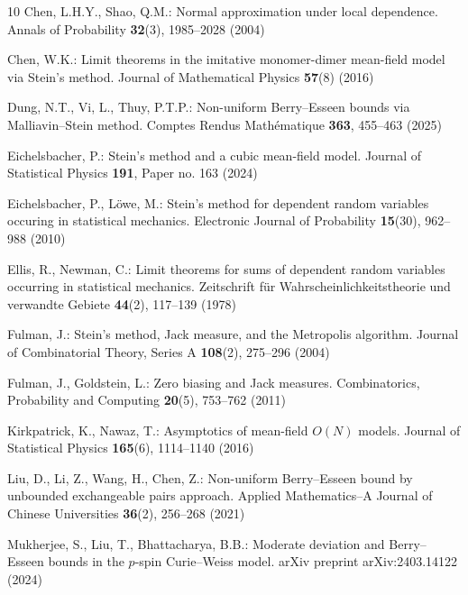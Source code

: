 \begin{thebibliography}{10}
	Chen, L.H.Y., Shao, Q.M.: Normal approximation under local dependence.
	\newblock Annals of Probability \textbf{32}(3), 1985--2028 (2004)
	
	Chen, W.K.: {Limit theorems in the imitative monomer-dimer mean-field model via
		Stein’s method}.
	\newblock Journal of Mathematical Physics \textbf{57}(8) (2016)
	
	Dung, N.T., Vi, L., Thuy, P.T.P.: {Non-uniform Berry--Esseen bounds via
		Malliavin--Stein method}.
	\newblock Comptes Rendus Math\'{e}matique \textbf{363}, 455--463 (2025)
	
	Eichelsbacher, P.: {Stein's method and a cubic mean-field model}.
	\newblock Journal of Statistical Physics \textbf{191}, Paper no. 163 (2024)
	
	Eichelsbacher, P., L{\"o}we, M.: {Stein's method for dependent random variables
		occuring in statistical mechanics}.
	\newblock Electronic Journal of Probability \textbf{15}(30), 962--988 (2010)
	
	Ellis, R., Newman, C.: {Limit theorems for sums of dependent random variables
		occurring in statistical mechanics}.
	\newblock Zeitschrift f{\"u}r Wahrscheinlichkeitstheorie und verwandte Gebiete
	\textbf{44}(2), 117--139 (1978)
	
	Fulman, J.: {Stein's method, Jack measure, and the Metropolis algorithm}.
	\newblock Journal of Combinatorial Theory, Series A \textbf{108}(2), 275--296
	(2004)
	
	Fulman, J., Goldstein, L.: {Zero biasing and Jack measures}.
	\newblock Combinatorics, Probability and Computing \textbf{20}(5), 753--762
	(2011)
	
	Kirkpatrick, K., Nawaz, T.: {Asymptotics of mean-field $O(N)$ models}.
	\newblock Journal of Statistical Physics \textbf{165}(6), 1114--1140 (2016)
	
	Liu, D., Li, Z., Wang, H., Chen, Z.: {Non-uniform Berry--Esseen bound by
		unbounded exchangeable pairs approach}.
	\newblock Applied Mathematics--A Journal of Chinese Universities
	\textbf{36}(2), 256--268 (2021)
	
	Mukherjee, S., Liu, T., Bhattacharya, B.B.: {Moderate deviation and
		Berry--Esseen bounds in the $p$-spin Curie--Weiss model}.
	\newblock arXiv preprint arXiv:2403.14122  (2024)
	

\end{thebibliography}
